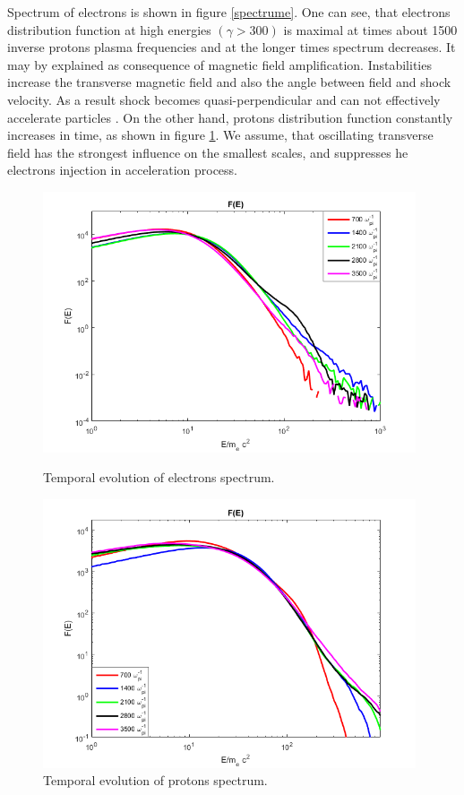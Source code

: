 \documentclass[a4paper]{jpconf}
\begin{document}
	Spectrum of electrons is shown in figure \ref{spectrume}. One can see, that electrons distribution function at high energies $(\gamma > 300)$ is maximal at times about 1500 inverse protons plasma frequencies and at the longer times spectrum decreases. It may by explained as consequence of magnetic field amplification. Instabilities increase the transverse magnetic field and also the angle between field and shock velocity. As a result shock becomes quasi-perpendicular and can not effectively accelerate particles \cite{Sironi2011}. On the other hand, protons distribution function constantly increases in time, as shown in figure \ref{spectrump}. We assume, that oscillating transverse field has the strongest influence on the smallest scales, and suppresses he electrons injection in acceleration process.
	
	
	\begin{figure}[h!]
		\centering
		\begin{minipage}{0.8\textwidth}
			\centering
			\includegraphics[width=0.98\textwidth]{fig/spectrum.png} 
			\caption{Temporal evolution of electrons spectrum.}
			\label{spectrume}
		\end{minipage}\hfill
		\begin{minipage}{0.8\textwidth}
			\centering
			\includegraphics[width=0.98\textwidth]{fig/spectrump.png} 
			\caption{Temporal evolution of protons spectrum.}
			\label{spectrump}
		\end{minipage}
	\end{figure}
	
\end{document}

